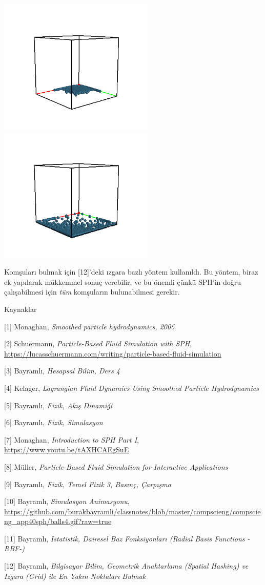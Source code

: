 \documentclass[12pt,fleqn]{article}\usepackage{../../common}
\begin{document}
\includegraphics[width=20em]{glutout-006.png}
\includegraphics[width=20em]{glutout-008.png}

Komşuları bulmak için [12]'deki ızgara bazlı yöntem kullanıldı. Bu yöntem, biraz
ek yapılarak mükkemmel sonuç verebilir, ve bu önemli çünkü SPH'in doğru
çalışabilmesi için {\em tüm} komşuların bulunabilmesi gerekir.


Kaynaklar

[1] Monaghan, {\em Smoothed particle hydrodynamics, 2005}

[2] Schuermann, {\em Particle-Based Fluid Simulation with SPH},
    \url{https://lucasschuermann.com/writing/particle-based-fluid-simulation}

[3] Bayramlı, {\em Hesapsal Bilim, Ders 4}

[4] Kelager, {\em Lagrangian Fluid Dynamics Using Smoothed Particle Hydrodynamics}

[5] Bayramlı, {\em Fizik, Akış Dinamiği}

[6] Bayramlı, {\em Fizik, Simulasyon}

[7] Monaghan, {\em Introduction to SPH Part I},
    \url{https://www.youtu.be/tAXHCAEgSuE}

[8] Müller, {\em Particle-Based Fluid Simulation for Interactive Applications}

[9] Bayramlı, {\em Fizik, Temel Fizik 3, Basınç, Çarpışma}

[10] Bayramlı, {\em Simulasyon Animasyonu},
    \url{https://github.com/burakbayramli/classnotes/blob/master/compscieng/compscieng_app40sph/balls4.gif?raw=true}

[11] Bayramlı, {\em Istatistik, Dairesel Baz Fonksiyonları (Radial Basis Functions -RBF-)}

[12] Bayramlı, {\em Bilgisayar Bilim, Geometrik Anahtarlama (Spatial Hashing) ve Izgara (Grid) ile En Yakın Noktaları Bulmak}
\end{document}
